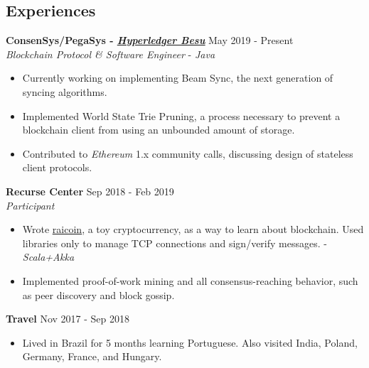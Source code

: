 \documentclass[overlapped]{res}
\begin{document}

\address{\href{https://ratanrsur.github.io}{\underline{ratanrsur.github.io}} \\ \href{https://www.github.com/ratanrsur}{\underline{github.com/ratanrsur}}}
\address{\href{mailto:ratan.r.sur@gmail.com}{\underline{ratan.r.sur@gmail.com}} \\ \hfill +1 646 410 6411\\\hfill{}US Citizen}
\begin{resume}


    \section{Experiences}

    {\bf ConsenSys/PegaSys - \href{https://www.github.com/Hyperledger/Besu}{\underline{\em Hyperledger Besu}}} \hfill May 2019 - Present \\
    {\em Blockchain Protocol \& Software Engineer\/} - {\em Java}
    \begin{itemize} \itemsep-2pt
        \item Currently working on implementing Beam Sync, the next generation of syncing algorithms.
        \item
            Implemented World State Trie Pruning, a process necessary to prevent a blockchain client from using an unbounded amount of storage.
        \item
            Contributed to {\em Ethereum\/} 1.x community calls, discussing design of stateless client protocols.
    \end{itemize}

    {\bf Recurse Center} \hfill Sep 2018 - Feb 2019 \\
    {\em Participant\/}
    \begin{itemize} \itemsep-2pt
        \item
            Wrote \href{https://www.github.com/ratanrsur/raicoin}{\underline{raicoin}}, a toy cryptocurrency, as a way to learn about blockchain.
            Used libraries only to manage TCP connections and sign/verify messages. - {\em Scala+Akka}
        \item
            Implemented proof-of-work mining and all consensus-reaching behavior, such as peer discovery and block gossip.
    \end{itemize}

    {\bf Travel} \hfill Nov 2017 - Sep 2018
    \begin{itemize} \itemsep-2pt
        \item
            Lived in Brazil for 5 months learning Portuguese.
            Also visited India, Poland, Germany, France, and Hungary.
    \end{itemize}



\end{resume}
\end{document}

